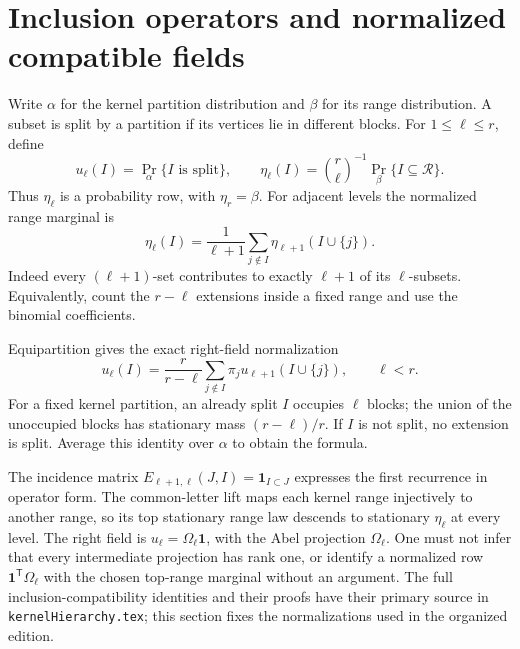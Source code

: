 \section{Inclusion operators and normalized compatible fields}
\label{organized:inclusion-fields}

Write $\alpha$ for the kernel partition distribution and $\beta$ for its
range distribution. A subset is split by a partition if its vertices lie
in different blocks. For $1\le\ell\le r$, define
\[
 u_\ell(I)=\Pr_\alpha\{I\text{ is split}\},\qquad
 \eta_\ell(I)=\binom r\ell^{-1}\Pr_\beta\{I\subseteq\mathcal R\}.
\]
Thus $\eta_\ell$ is a probability row, with $\eta_r=\beta$. For adjacent
levels the normalized range marginal is
\[
 \eta_\ell(I)=\frac1{\ell+1}
 \sum_{j\notin I}\eta_{\ell+1}(I\cup\{j\}).
\]
Indeed every $(\ell+1)$-set contributes to exactly $\ell+1$ of its
$\ell$-subsets. Equivalently, count the $r-\ell$ extensions inside a
fixed range and use the binomial coefficients.

Equipartition gives the exact right-field normalization
\[
 u_\ell(I)=\frac r{r-\ell}
 \sum_{j\notin I}\pi_j u_{\ell+1}(I\cup\{j\}),\qquad\ell<r.
\]
For a fixed kernel partition, an already split $I$ occupies $\ell$ blocks;
the union of the unoccupied blocks has stationary mass $(r-\ell)/r$.
If $I$ is not split, no extension is split. Average this identity over
$\alpha$ to obtain the formula.

The incidence matrix $E_{\ell+1,\ell}(J,I)=\mathbf1_{I\subset J}$
expresses the first recurrence in operator form. The common-letter lift
maps each kernel range injectively to another range, so its top stationary
range law descends to stationary $\eta_\ell$ at every level.
The right field is $u_\ell=\Omega_\ell\mathbf1$, with the Abel projection
$\Omega_\ell$. One must not infer that every intermediate projection has
rank one, or identify a normalized row $\mathbf1^{\mathsf T}\Omega_\ell$
with the chosen top-range marginal without an argument.
The full inclusion-compatibility identities and their proofs have their
primary source in \texttt{kernelHierarchy.tex}; this section fixes the
normalizations used in the organized edition.

